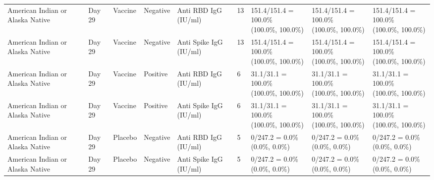 \documentclass[]{book}
\theoremstyle{definition}
\theoremstyle{definition}
\theoremstyle{definition}
\newcommand{\1}{\mathbbm{1}}
\begin{document}
\begin{landscape}
\begin{ThreePartTable}
\begin{longtable}[t]{>{\raggedright\arraybackslash}p{2.7cm}llllllll}
\hspace{1em}American Indian or Alaska Native & Day 29 & Vaccine & Negative & Anti RBD IgG (IU/ml) & 13 & \makecell[l]{151.4/151.4 = 100.0\%\\(100.0\%, 100.0\%)} & \makecell[l]{151.4/151.4 = 100.0\%\\(100.0\%, 100.0\%)} & \makecell[l]{151.4/151.4 = 100.0\%\\(100.0\%, 100.0\%)}\\
\hspace{1em}American Indian or Alaska Native & Day 29 & Vaccine & Negative & Anti Spike IgG (IU/ml) & 13 & \makecell[l]{151.4/151.4 = 100.0\%\\(100.0\%, 100.0\%)} & \makecell[l]{151.4/151.4 = 100.0\%\\(100.0\%, 100.0\%)} & \makecell[l]{151.4/151.4 = 100.0\%\\(100.0\%, 100.0\%)}\\
\hspace{1em}American Indian or Alaska Native & Day 29 & Vaccine & Positive & Anti RBD IgG (IU/ml) & 6 & \makecell[l]{31.1/31.1 = 100.0\%\\(100.0\%, 100.0\%)} & \makecell[l]{31.1/31.1 = 100.0\%\\(100.0\%, 100.0\%)} & \makecell[l]{31.1/31.1 = 100.0\%\\(100.0\%, 100.0\%)}\\
\hspace{1em}American Indian or Alaska Native & Day 29 & Vaccine & Positive & Anti Spike IgG (IU/ml) & 6 & \makecell[l]{31.1/31.1 = 100.0\%\\(100.0\%, 100.0\%)} & \makecell[l]{31.1/31.1 = 100.0\%\\(100.0\%, 100.0\%)} & \makecell[l]{31.1/31.1 = 100.0\%\\(100.0\%, 100.0\%)}\\
\hspace{1em}American Indian or Alaska Native & Day 29 & Placebo & Negative & Anti RBD IgG (IU/ml) & 5 & \makecell[l]{0/247.2 = 0.0\%\\(0.0\%, 0.0\%)} & \makecell[l]{0/247.2 = 0.0\%\\(0.0\%, 0.0\%)} & \makecell[l]{0/247.2 = 0.0\%\\(0.0\%, 0.0\%)}\\
\hspace{1em}American Indian or Alaska Native & Day 29 & Placebo & Negative & Anti Spike IgG (IU/ml) & 5 & \makecell[l]{0/247.2 = 0.0\%\\(0.0\%, 0.0\%)} & \makecell[l]{0/247.2 = 0.0\%\\(0.0\%, 0.0\%)} & \makecell[l]{0/247.2 = 0.0\%\\(0.0\%, 0.0\%)}\\

\end{longtable}
\end{ThreePartTable}
\end{landscape}
\end{document}
